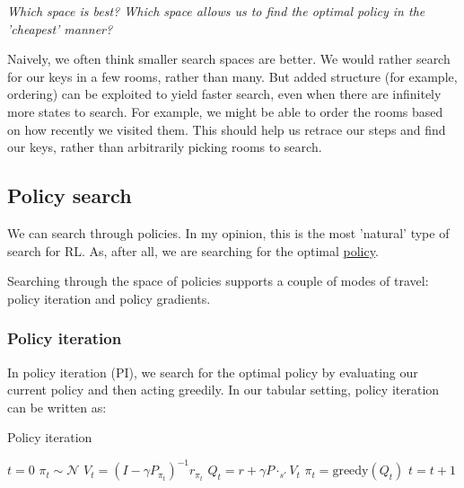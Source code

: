 \begin{displayquote}
  \textsl{Which space is best? Which space allows us to find the optimal policy in the 'cheapest' manner?}
\end{displayquote}

Naively, we often think smaller search spaces are better. We would rather
search for our keys in a few rooms, rather than many. But added
structure (for example, ordering) can be exploited to yield faster
search, even when there are infinitely more states to search. For example,
we might be able to order the rooms based on how recently we visited them.
This should help us retrace our steps and find our keys, rather than arbitrarily
picking rooms to search.

\subsection{Policy search}

We can search through policies. In my opinion, this is the most 'natural' type of search for RL.
As, after all, we are searching for the optimal \underline{policy}.

Searching through the space of policies supports a couple of modes of travel:
policy iteration and policy gradients.

\subsubsection{Policy iteration}

In policy iteration (PI), we search for the optimal policy by evaluating our current
policy and then acting greedily. In our tabular setting, policy iteration can be written as:

\begin{algorithm}[H]
\caption{Policy iteration}
\begin{algorithmic}[1]

    \State $t=0$
    \State $\pi_t \sim \mathcal N$  
      \State $V_t = (I-\gamma P_{\pi_t})^{-1} r_{\pi_t}$ 
      \State $Q_t =  r + \gamma P\cdot_{s'} V_t$ 
      \State $\pi_t = \text{greedy}(Q_t) $ 
      \State $t = t + 1$
    \EndWhile
    \State {}
\EndProcedure

\end{algorithmic}
\end{algorithm}

